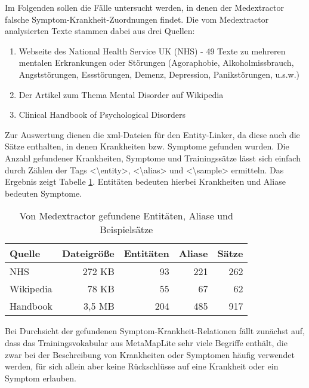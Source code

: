 Im Folgenden sollen die Fälle untersucht werden, in denen der Medextractor falsche Symptom-Krankheit-Zuordnungen findet. Die vom Medextractor analysierten Texte stammen dabei aus drei Quellen:

\begin{enumerate}
	\item Webseite des National Health Service UK (NHS) - 49 Texte zu mehreren mentalen Erkrankungen oder Störungen (Agoraphobie, Alkoholmissbrauch, Angststörungen, Essstörungen, Demenz, Depression, Panikstörungen, u.s.w.) \cite{nhs_webpage}
	\item Der Artikel zum Thema Mental Disorder auf Wikipedia \cite{wikimentaldisorder}
	\item Clinical Handbook of Psychological Disorders \cite{clinicalhandbook}
\end{enumerate}

Zur Auswertung dienen die xml-Dateien für den Entity-Linker, da diese auch die Sätze enthalten, in denen Krankheiten bzw. Symptome gefunden wurden. Die Anzahl gefundener Krankheiten, Symptome und Trainingssätze lässt sich einfach durch Zählen der Tags <\textbackslash entity>, <\textbackslash alias> und <\textbackslash sample> ermitteln. Das Ergebnis zeigt Tabelle \ref{tab:zaehlung}. Entitäten bedeuten hierbei Krankheiten und Aliase bedeuten Symptome.

\begin{table}
\begin{center}
\begin{tabular}{lrrrr}
\hline
\textbf{Quelle}	& \textbf{Dateigröße}	& \textbf{Entitäten} & \textbf{Aliase} & \textbf{Sätze} \\
\hline
NHS &	272 KB & 93 & 221 & 262 \\
Wikipedia & 78 KB & 55 & 67  & 62 \\
Handbook & 3,5 MB & 204 & 485  & 917 \\
\hline
\end{tabular}
\caption{Von Medextractor gefundene Entitäten, Aliase und Beispielsätze}
\label{tab:zaehlung}
\end{center}
\end{table}

Bei Durchsicht der gefundenen Symptom-Krankheit-Relationen fällt zunächst auf, dass das Trainingsvokabular aus MetaMapLite sehr viele Begriffe enthält, die zwar bei der Beschreibung von Krankheiten oder Symptomen häufig verwendet werden, für sich allein aber keine Rückschlüsse auf eine Krankheit oder ein Symptom erlauben.

